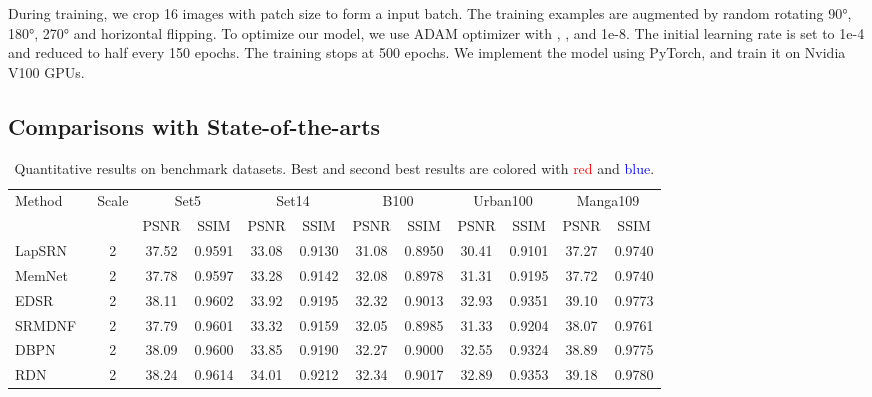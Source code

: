\documentclass[10pt,twocolumn,letterpaper]{article}
\begin{document}
During training, we crop 16 images with patch size  to form a input batch. The training examples are augmented by random rotating \ang{90}, \ang{180}, \ang{270} and horizontal flipping. To optimize our model, we use ADAM optimizer \cite{kingma2014adam} with , , and 1e-8. The initial learning rate is set to 1e-4 and reduced to half every 150 epochs. The training stops at 500 epochs. We implement the model using PyTorch, and train it on Nvidia V100 GPUs. 

\subsection{Comparisons with State-of-the-arts}
\begin{table*}[thbp]\setlength{\tabcolsep}{7pt}
\small
\center
\begin{center}
\caption{Quantitative results on benchmark datasets. Best and second best results are colored with \textcolor{red}{red} and \textcolor{blue}{blue}.}
\label{tab:results_psnr_ssim_x2348}
\begin{tabular}{|l|c|c|c|c|c|c|c|c|c|c|c|}
\hline
\multirow{2}{*}{Method} & \multirow{2}{*}{Scale} &  \multicolumn{2}{c|}{Set5} &  \multicolumn{2}{c|}{Set14} &  \multicolumn{2}{c|}{B100} &  \multicolumn{2}{c|}{Urban100} &  \multicolumn{2}{c|}{Manga109}  
\\
\cline{3-12}
&  & PSNR & SSIM & PSNR & SSIM & PSNR & SSIM & PSNR & SSIM & PSNR & SSIM 
\\
\hline
\hline


LapSRN~\cite{lai2017deep} & 2 
& 37.52
 & 0.9591
  & 33.08
   & 0.9130
    & 31.08
     & 0.8950
      & 30.41
       & 0.9101
        & 37.27
         & 0.9740
                   
\\
MemNet~\cite{tai2017memnet} & 2 
& 37.78
 & 0.9597
  & 33.28
   & 0.9142
    & 32.08
     & 0.8978
      & 31.31
       & 0.9195
        & 37.72
         & 0.9740
                   
\\
EDSR~\cite{lim2017enhanced} & 2 
& 38.11
 & 0.9602
  & 33.92
   & 0.9195
    & 32.32
     & 0.9013
      & 32.93
       & 0.9351
        & 39.10
         & 0.9773
                   
\\
SRMDNF~\cite{zhang2018learning} & 2 
& 37.79
 & 0.9601
  & 33.32
   & 0.9159
    & 32.05
     & 0.8985
      & 31.33
       & 0.9204
        & 38.07
         & 0.9761
                   
\\
DBPN~\cite{haris2018deep} & 2 
& 38.09
 & 0.9600
  & 33.85
   & 0.9190
    & 32.27
     & 0.9000
      & 32.55
       & 0.9324
        & 38.89
         & 0.9775        
\\
RDN~\cite{zhang2018residual} & 2 
& 38.24
 & 0.9614
  & 34.01
   & 0.9212
    & 32.34
     & 0.9017
      & 32.89
       & 0.9353
        & 39.18
         & 0.9780
         

\end{tabular}
\end{center}
\end{table*}
\end{document}
